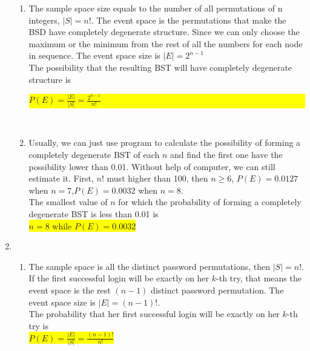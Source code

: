 \documentclass{article}
\begin{document}
\begin{enumerate}
\begin{enumerate}
		\item
		\mysolu
		The sample space size equals to the number of all permutations of n integers, ${|S|=n!}$. The event space is the permutations that make the BSD have completely degenerate structure. Since we can only choose the maximum or the minimum from the rest of all the numbers for each node in sequence. The event space size is ${|E|=2^{n-1}}$\\
		\myansw
		The possibility that the resulting BST will have completely degenerate structure is\\
		\colorbox{yellow}{
			${P(E)=\frac{|E|}{|S|}=\frac{2^{n-1}}{n!}}$
			
		}\\
	
		\item
		\mysolu
		Usually, we can just use program to calculate the possibility of forming a completely degenerate BST of each ${n}$ and find the first one have the possibility lower than 0.01. Without help of computer, we can still estimate it. First, ${n!}$ must higher than 100, then ${n\geqslant6}$, ${P(E) = 0.0127}$  when ${n = 7}$,${P(E) = 0.0032}$ when ${ n = 8}$.\\
		\myansw
		The smallest value of ${n}$ for which the probability of forming a completely degenerate BST is less than 0.01 is\\
		\colorbox{yellow}{
			${n = 8}$ while ${P(E) = 0.0032}$
		}\\
		
		
	\end{enumerate}
	\item
	\begin{enumerate}
		\item
		\mysolu
		The sample space is all the distinct password permutations, then ${|S|=n!}$. If the first successful login will be exactly on her ${k}$-th try, that means the event space is the rest ${(n-1)}$ distinct password permutation. The event space size is ${|E|=(n-1)!}$.\\
		\myansw
		The probability that her first successful login will be exactly on her ${k}$-th try is\\
		\colorbox{yellow}{
			${P(E)=\frac{|E|}{|S|}=\frac{(n-1)!}{n!}}$
		}
		
	\end{enumerate}

	
	


\end{enumerate}

\newpage
\end{document}
